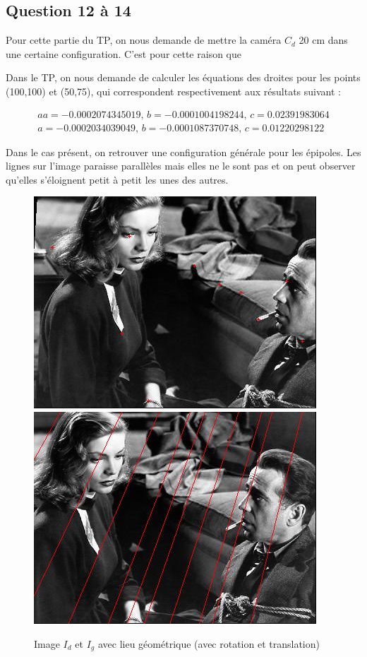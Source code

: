 \documentclass[12pt]{report}
\begin{document}
\subsection*{Question 12 à 14}

Pour cette partie du TP, on nous demande de mettre la caméra $C_d$ 20 cm dans une certaine configuration. C'est pour cette raison que 

Dans le TP, on nous demande de calculer les équations des droites pour les points (100,100) et (50,75), qui correspondent respectivement aux résultats suivant :

\[\begin{matrix}
aa = -0.0002074345019, \,b = -0.0001004198244,\, c = 0.02391983064\\ 
a = -0.0002034039049, \,b = -0.0001087370748, \,c = 0.01220298122
\end{matrix}\] 

Dans le cas présent, on retrouver une configuration générale pour les épipoles. Les lignes sur l'image paraisse parallèles mais elles ne le sont pas et on peut observer qu'elles s'éloignent petit à petit les unes des autres.

\begin{figure}[H]
\begin{center}
\includegraphics[scale=0.5]{Image/I4d.jpg} 
\includegraphics[scale=0.5]{Image/I4g.jpg} 
\caption{Image $I_d$ et $I_g$ avec lieu géométrique (avec rotation et translation)}
\end{center}
\end{figure}
\end{document}
